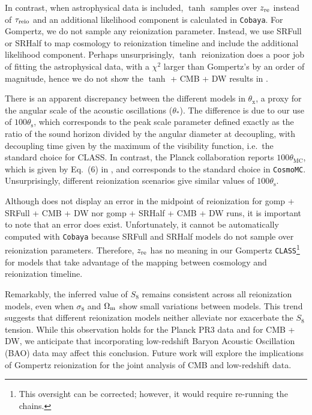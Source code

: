 In contrast, when astrophysical data is included, $\tanh$ samples over
$z_{\mathrm{re}}$ instead of $\tau_{\mathrm{reio}}$ and an additional likelihood component
is calculated in \texttt{Cobaya}.  
For Gompertz, we do not sample any reionization parameter. Instead, we 
use SRFull or SRHalf to map cosmology to reionization timeline and 
include the additional likelihood component. Perhaps unsurprisingly, 
$\tanh$ reionization does a poor job of fitting the astrophysical data, 
with a $\chi^2$ larger than Gompertz's by an order of magnitude,
hence we do not show the $\tanh$ + CMB + DW results in
 .

There is an apparent discrepancy between the different models in
$\theta_\mathrm{x}$, a proxy for the angular scale of the acoustic
oscillations ($\theta_*$).
The difference is due to our use of $100\theta_\mathrm{s}$, which
corresponds to the peak scale parameter defined exactly as the
ratio of the sound horizon divided by the angular diameter at
decoupling, with decoupling time given by the maximum of the visibility
function, i.e.\ the standard choice for CLASS.
In contrast, the Planck collaboration reports $100\theta_\mathrm{MC}$,
which is given by Eq.~(6) in \cite{Planck2014}, and corresponds to the
standard choice in \texttt{CosmoMC}\cite{Lewis2002}. Unsurprisingly,
different reionization scenarios give similar values of $100\theta_\mathrm{s}$.

Although  does not display an error in the midpoint of
reionization for gomp + SRFull + CMB + DW nor gomp + SRHalf + CMB + DW runs, 
it is important to note that an error does exist. Unfortunately, it cannot be 
automatically computed with \texttt{Cobaya} because SRFull and SRHalf
models do not sample over reionization parameters. Therefore, $z_{\mathrm{re}}$ 
has no meaning in our Gompertz \texttt{CLASS}\footnote{This oversight
can be corrected; however, it would require re-running the chains.}
for models that take advantage of the mapping between cosmology
and reionization timeline.

Remarkably, the inferred value of $S_8$ remains consistent across all reionization
models, even when $\sigma_8$ and $\Omega_\mathrm{m}$ show small variations between
models. This trend suggests that different reionization models neither alleviate 
nor exacerbate the $S_8$ tension. While this observation holds for the Planck
PR3 data and for CMB + DW, we anticipate that
incorporating low-redshift Baryon Acoustic Oscillation (BAO) data may affect this
conclusion. Future work will explore the implications of Gompertz reionization
for the joint analysis of CMB and low-redshift data.


\FloatBarrier
